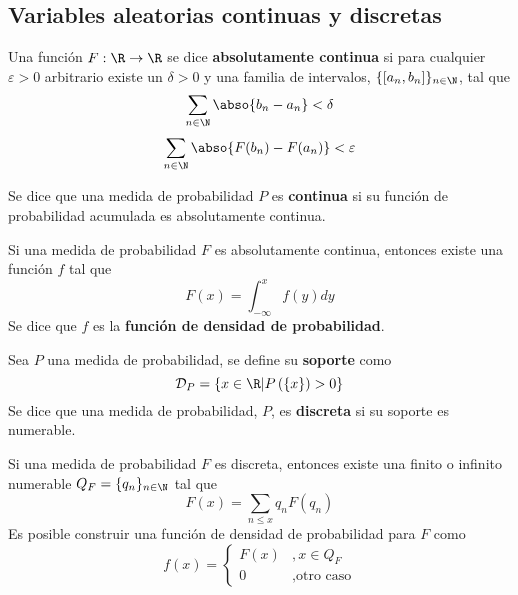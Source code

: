 
\subsection{Variables aleatorias continuas y discretas}

\begin{definicion}
Una función $F: \R \rightarrow \R$ se dice \textbf{absolutamente continua} si para cualquier $\varepsilon>0$ arbitrario existe un $\delta>0$ y una familia de intervalos, $\{ [a_n, b_n]\}_{n\in \N}$, tal que
\begin{equation}
\sum_{n\in \N} \abso{b_n - a_n} < \delta 
\end{equation}
\begin{equation}
\sum_{n\in \N} \abso{F(b_n) - F(a_n)} < \varepsilon 
\end{equation}
\end{definicion}

Se dice que una medida de probabilidad $P$ es \textbf{continua} si su función de probabilidad acumulada es absolutamente continua.

\begin{proposicion}
Si una medida de probabilidad $F$ es absolutamente continua, entonces existe una función $f$ tal que 
\begin{equation}
F(x) = \int_{-\infty}^{x}f(y) dy
\end{equation}
Se dice que $f$ es la \textbf{función de densidad de probabilidad}.
\end{proposicion}

Sea $P$ una medida de probabilidad, se define su \textbf{soporte} como
\begin{equation}
\mathcal{D}_P = \left\{ x\in \R \lvert P\left( \left\{ x\right\} \right)>0 \right\}
\end{equation}
%
Se dice que una medida de probabilidad, $P$, es \textbf{discreta} si su soporte es numerable.

\begin{proposicion}
Si una medida de probabilidad $F$ es discreta, entonces existe una finito o infinito numerable $Q_F=\{q_n\}_{n\in \N}$ tal que 
\begin{equation}
F(x) = \sum_{n\leq x} q_n F({q_n})
\end{equation}
Es posible construir una función de densidad de probabilidad para $F$ como
\begin{equation}
f(x) = \begin{cases}
F({x}) &, x\in Q_F \\
0 &, \text{otro caso}
\end{cases}
\end{equation}
\end{proposicion}

